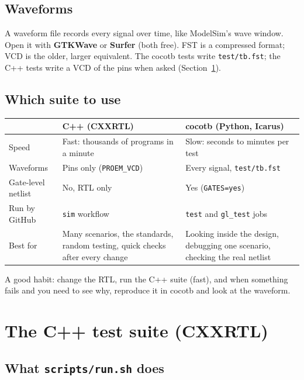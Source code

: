 \documentclass[11pt,a4paper]{article}
\newcommand{\file}[1]{\texttt{#1}}
\newcommand{\cmd}[1]{\texttt{#1}}
\begin{document}
\subsection{Waveforms}

A waveform file records every signal over time, like ModelSim's wave window. Open it with \textbf{GTKWave} or \textbf{Surfer} (both free). FST is a compressed format; VCD is the older, larger equivalent. The cocotb tests write \file{test/tb.fst}; the C++ tests write a VCD of the pins when asked (Section~\ref{sec:cxxrtl}).

\subsection{Which suite to use}

\begin{center}
\begin{tabularx}{\linewidth}{@{}lLL@{}}
\toprule
 & C++ (CXXRTL) & cocotb (Python, Icarus) \\
\midrule
Speed & Fast: thousands of programs in a minute & Slow: seconds to minutes per test \\
Waveforms & Pins only (\texttt{PROEM\_VCD}) & Every signal, \file{test/tb.fst} \\
Gate-level netlist & No, RTL only & Yes (\texttt{GATES=yes}) \\
Run by GitHub & \cmd{sim} workflow & \cmd{test} and \cmd{gl\_test} jobs \\
Best for & Many scenarios, the standards, random testing, quick checks after every change & Looking inside the design, debugging one scenario, checking the real netlist \\
\bottomrule
\end{tabularx}
\end{center}

A good habit: change the RTL, run the C++ suite (fast), and when something fails and you need to see why, reproduce it in cocotb and look at the waveform.

\section{The C++ test suite (CXXRTL)}\label{sec:cxxrtl}

\subsection{What \file{scripts/run.sh} does}
\end{document}
